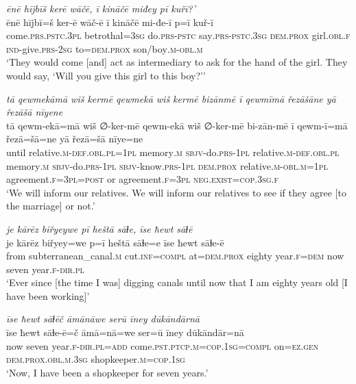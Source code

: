 \ea \label{ŽE.80}
\textit{ēnē hījbīš kerē wāčē, ī kināčē miđey pī kuřī?’} \\ 
\gll ēnē hījbī=š ker-ē wāč-ē ī kināčē mi-đe-ī p=ī kuř-ī \\ 
 come\textsc{.prs}\textsc{.pstc}\textsc{.3pl} betrothal\textsc{=3sg} do\textsc{.prs}\textsc{-pstc} say\textsc{.prs-pstc}\textsc{.3sg} \textsc{dem.prox} girl\textsc{.obl}\textsc{.f} \textsc{ind-}give\textsc{.prs}-\textsc{2sg} to=\textsc{dem.prox} son/boy\textsc{.m}\textsc{-obl}\textsc{.m} \\ 
\glt `They would come [and] act as intermediary to ask for the hand of the girl. They would say, ‘Will you give this girl to this boy?’'
\z 
 
\ea \label{ŽE.83}
\textit{tā qewmekāmā wiš kermē qewmekā wiš kermē bizānmē ī qewmīmā řezāšāne yā řezāšā nīyene} \\ 
\gll tā qewm-ekā=mā wiš ∅-ker-mē qewm-ekā wiš ∅-ker-mē bi-zān-mē ī qewm-ī=mā řezā=šā=ne yā řezā=šā nīye=ne \\ 
 until relative\textsc{.m}\textsc{-def}\textsc{.obl}\textsc{.pl}\textsc{=1pl} memory\textsc{.m} \textsc{sbjv-}do\textsc{.prs}\textsc{-1pl} relative\textsc{.m}\textsc{-def}\textsc{.obl}\textsc{.pl} memory\textsc{.m} \textsc{sbjv-}do\textsc{.prs}\textsc{-1pl} \textsc{sbjv-}know\textsc{.prs}\textsc{-1pl} \textsc{dem.prox} relative\textsc{.m}\textsc{-obl}\textsc{.m}\textsc{=1pl} agreement\textsc{.f}\textsc{=3pl}\textsc{=\textsc{post}} or agreement\textsc{.f}\textsc{=3pl} \textsc{\textsc{neg.}exist}\textsc{=cop}\textsc{.3sg}\textsc{.f} \\ 
\glt `We will inform our relatives. We will inform our relatives to see if they agree [to the  marriage] or not.'
\z 
 
\ea \label{ŽM.7}
\textit{je kārēz biřyeywe pī heštā sāɫe, īse ħewt sāɫē} \\ 
\gll je kārēz biřyey=we p=ī heštā sāɫe=e īse ħewt sāɫe-ē \\ 
 from subterranean\_canal\textsc{.m} cut\textsc{.inf}\textsc{=compl} at=\textsc{dem.prox} eighty year\textsc{.f}\textsc{=dem} now seven year\textsc{.f}\textsc{-dir}\textsc{.pl} \\ 
\glt `Ever since [the time I was] digging canals until now that I am eighty years old [I have been working]'
\z 
 
\ea \label{ŽM.8}
\textit{īse ħewt sāɫēč āmānāwe serū īney dūkāndārnā} \\ 
\gll īse ħewt sāɫe-ē=č āmā=nā=we ser=ū īney dūkāndār=nā \\ 
 now seven year\textsc{.f}\textsc{-dir}\textsc{.pl}\textsc{=add} come\textsc{.pst}\textsc{.ptcp}\textsc{.m}\textsc{=cop}\textsc{.\textsc{1sg}}\textsc{=compl} on\textsc{=ez.gen} \textsc{dem.prox}\textsc{.obl}\textsc{.m}\textsc{.3sg} shopkeeper\textsc{.m}\textsc{=cop}\textsc{.\textsc{1sg}} \\ 
\glt `Now, I have been a shopkeeper for seven years.'
\z 
 
